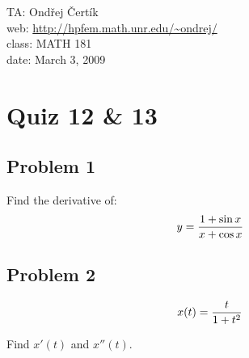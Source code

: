 \documentclass[10pt]{article}
\begin{document}
\noindent TA: Ondřej Čertík\\
web: \url{http://hpfem.math.unr.edu/~ondrej/}\\
class: MATH 181\\
date: March 3, 2009

\section*{Quiz 12 \& 13}

\subsection{Problem 1}

Find the derivative of:
$$y = {1+\sin x\over x+ \cos x}$$

\subsection{Problem 2}

$$x(t) = {t\over 1+t^2}$$

Find $x'(t)$ and $x''(t)$.
\end{document}
